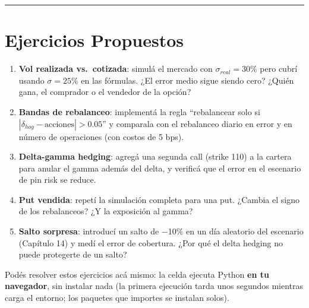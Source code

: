 \documentclass[
  spanish,
  letterpaper,
  DIV=11,
  numbers=noendperiod]{scrreprt}
\providecommand{\tightlist}{%
  \setlength{\itemsep}{0pt}\setlength{\parskip}{0pt}}
\begin{document}
\begin{center}\rule{0.5\linewidth}{0.5pt}\end{center}

\chapter{Ejercicios Propuestos}\label{ejercicios-propuestos-18}

\begin{tcolorbox}[enhanced jigsaw, bottomrule=.15mm, colback=white, opacitybacktitle=0.6, arc=.35mm, toprule=.15mm, opacityback=0, breakable, titlerule=0mm, left=2mm, coltitle=black, colbacktitle=quarto-callout-important-color!10!white, colframe=quarto-callout-important-color-frame, leftrule=.75mm, toptitle=1mm, bottomtitle=1mm, title=\textcolor{quarto-callout-important-color}{\faExclamation}\hspace{0.5em}{Ejercicios}, rightrule=.15mm]

\begin{enumerate}
\def\labelenumi{\arabic{enumi}.}
\tightlist
\item
  \textbf{Vol realizada vs.~cotizada}: simulá el mercado con
  \(\sigma_{real} = 30\%\) pero cubrí usando \(\sigma = 25\%\) en las
  fórmulas. ¿El error medio sigue siendo cero? ¿Quién gana, el comprador
  o el vendedor de la opción?
\item
  \textbf{Bandas de rebalanceo}: implementá la regla ``rebalancear solo
  si \(|\delta_{hoy} - \text{acciones}| > 0.05\)'' y comparala con el
  rebalanceo diario en error y en número de operaciones (con costos de 5
  bps).
\item
  \textbf{Delta-gamma hedging}: agregá una segunda call (strike 110) a
  la cartera para anular el gamma además del delta, y verificá que el
  error en el escenario de pin risk se reduce.
\item
  \textbf{Put vendida}: repetí la simulación completa para una put.
  ¿Cambia el signo de los rebalanceos? ¿Y la exposición al gamma?
\item
  \textbf{Salto sorpresa}: introducí un salto de −10\% en un día
  aleatorio del escenario (Capítulo 14) y medí el error de cobertura.
  ¿Por qué el delta hedging no puede protegerte de un salto?
\end{enumerate}

\end{tcolorbox}

Podés resolver estos ejercicios acá mismo: la celda ejecuta Python
\textbf{en tu navegador}, sin instalar nada (la primera ejecución tarda
unos segundos mientras carga el entorno; los paquetes que importes se
instalan solos).
\end{document}
